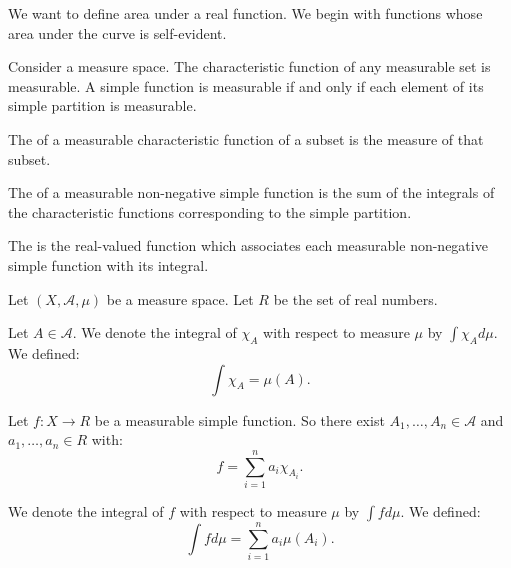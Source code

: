 
\sbasic



\sstart




We want to define area
under a real function.
We begin with functions
whose area under the curve
is self-evident.


Consider a measure space.
The characteristic function
of any measurable set
is measurable.
A simple function is measurable
if and only if
each element of
its simple partition
is measurable.

The
of a measurable characteristic function
of a subset is the
measure of that subset.

The
of a measurable non-negative simple function
is the sum of the integrals
of the characteristic functions
corresponding to the
simple partition.

The
is the real-valued function
which associates
each measurable non-negative simple
function with its integral.


Let $(X, \mathcal{A}, \mu)$
be a measure space.
Let
$R$ be the
set of real numbers.

Let $A \in \mathcal{A}$.
We denote the integral
of $\chi_{A}$ with
respect to measure $\mu$ by
$\int \chi_{A} d \mu$.
We defined:
\[
  \int \chi_{A} = \mu(A).
\]

Let $f: X \to R$ be
a measurable simple function.
So there exist
$A_1, \dots, A_n \in \mathcal{A}$
and $a_1, \dots, a_n \in R$ with:
\[
  f = \sum_{i = 1}^{n} a_i \chi_{A_i}.
\]

We denote the integral of
$f$
with respect to measure $\mu$
by $\int f d\mu$.
We defined:
\[
  \int f d\mu = \sum_{i = 1}^{n} a_i \mu(A_i).
\]


\strats

